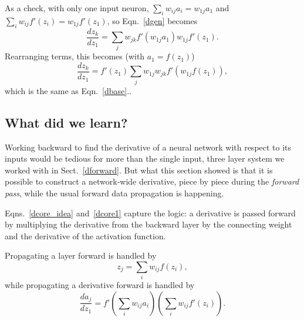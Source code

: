 \documentclass[12pt]{article}
\begin{document}
As a check, with only one input neuron, $\sum_i w_{ij}a_i=w_{1j}a_1$ and $\sum_i w_{ij}f'(z_i)=w_{1j}f'(z_1)$,
so Eqn.~\ref{dgen} becomes
\begin{equation}
\frac{dz_k}{dz_1}=\sum_j w_{jk}f'(w_{1j}a_1)w_{1j}f'(z_1).
\end{equation}
Rearranging terms, this becomes (with $a_1=f(z_1)$)
\begin{equation}
\frac{dz_k}{dz_1}=f'(z_1)\sum_j w_{1j} w_{jk}f'(w_{1j}f(z_1)),
\end{equation}
which is the same as Eqn.~\ref{dbase}..



\subsection{What did we learn?}
Working backward to find the derivative of a neural network with respect to its inputs would be tedious for more than the single input, three layer system we worked with in Sect.~\ref{dforward}. But what this section showed is that it is possible to construct a network-wide derivative, piece by piece during the {\sl forward pass}, while the usual forward data propagation is happening. 

Eqns.~\ref{dcore_idea} and~\ref{dcore1} capture the logic: a derivative is passed forward by multiplying the derivative from the backward layer by the connecting weight and the derivative of the activation function.

Propagating a layer forward is handled by
\begin{equation}
z_j=\sum_i w_{ij} f(z_i),
\end{equation}
while propagating a derivative forward is handled by
\begin{equation}
\frac{da_j}{dz_1}=f'\left(\sum_i w_{ij}a_i\right)\left(\sum_i w_{ij}f'(z_i)\right).
\end{equation}
\end{document}
